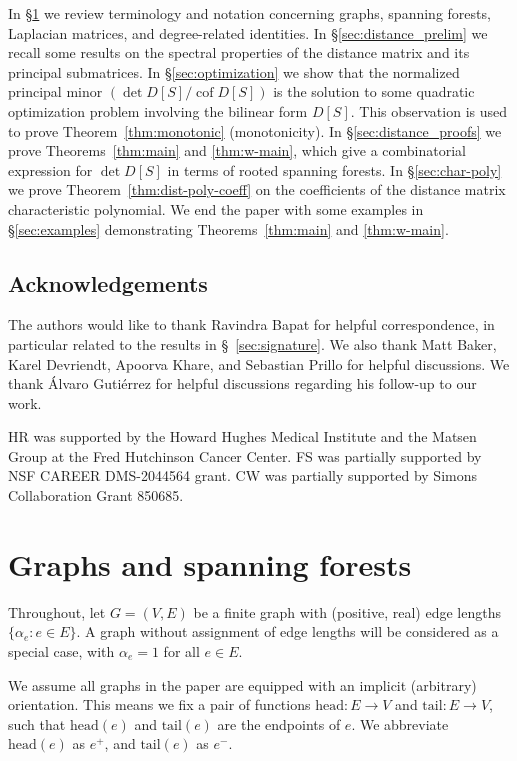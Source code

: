 \documentclass[12pt]{amsart}
\theoremstyle{definition}
\DeclareMathOperator{\cof}{cof}
\begin{document}
In \S\ref{sec:graphs-matrices} we review terminology and notation concerning graphs, spanning forests, Laplacian matrices, and degree-related identities.
In \S\ref{sec:distance_prelim} we recall some results on the spectral properties of the distance matrix and its principal submatrices.
In \S\ref{sec:optimization} we show that the normalized principal minor $(\det D[S] / \cof D[S])$ is the solution to some quadratic optimization problem involving the bilinear form $D[S]$.
This observation is used to prove
Theorem~\ref{thm:monotonic} (monotonicity).
In \S\ref{sec:distance_proofs} we prove Theorems~\ref{thm:main} and \ref{thm:w-main}, which give a combinatorial expression for $\det D[S]$ in terms of rooted spanning forests.
In \S\ref{sec:char-poly} we prove Theorem~\ref{thm:dist-poly-coeff} on the coefficients of the distance matrix characteristic polynomial.
We end the paper with some examples in \S\ref{sec:examples} demonstrating Theorems~\ref{thm:main} and \ref{thm:w-main}.


\subsection*{Acknowledgements}
The authors would like to thank Ravindra Bapat for helpful correspondence,
in particular related to the results in \S~\ref{sec:signature}. 
We also thank Matt Baker, Karel Devriendt, Apoorva Khare, and Sebastian Prillo for helpful discussions.
We thank \'{A}lvaro Guti\'{e}rrez for helpful discussions regarding his follow-up to our work.

HR was supported by the Howard Hughes Medical Institute and the Matsen Group at the Fred Hutchinson Cancer Center. 
FS was partially supported by NSF CAREER DMS-2044564 grant.
CW was partially supported by Simons Collaboration Grant 850685.



\section{Graphs and spanning forests}
\label{sec:graphs-matrices}

Throughout, let $G = (V, E)$ be a finite graph with (positive, real) edge lengths $\{ \alpha_e \colon e \in E\}$. 
A graph without assignment of edge lengths will be considered as a special case, with $\alpha_e=1$ for all $e \in E$.

We assume all graphs in the paper are equipped with an implicit (arbitrary) orientation. This means we fix a pair of functions $\mathrm{head}\colon E \to V$ and $\mathrm{tail}\colon E \to V$, such that $\mathrm{head}(e)$ and $\mathrm{tail}(e)$ are the endpoints of $e$. We abbreviate $\mathrm{head}(e)$ as $e^+$, and $\mathrm{tail}(e)$ as $e^-$.
\end{document}
